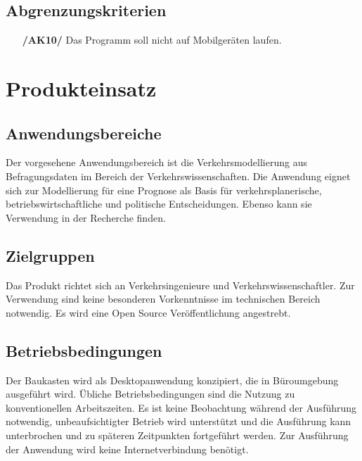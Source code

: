 \documentclass{article}
\begin{document}
\subsection{Abgrenzungskriterien}
\begin{itemize}
    \item[\textbf{/AK10/}] Das Programm soll nicht auf Mobilgeräten laufen.
\end{itemize}


\clearpage
\section{Produkteinsatz}
\subsection{Anwendungsbereiche}
Der vorgesehene Anwendungsbereich ist die Verkehrsmodellierung aus Befragungsdaten im Bereich der Verkehrswissenschaften. Die Anwendung eignet sich zur Modellierung für eine Prognose als Basis für verkehrsplanerische, betriebswirtschaftliche und politische Entscheidungen. Ebenso kann sie Verwendung in der Recherche finden.

\subsection{Zielgruppen}
Das Produkt richtet sich an Verkehrsingenieure und Verkehrswissenschaftler. Zur Verwendung sind keine besonderen Vorkenntnisse im technischen Bereich notwendig.\newline 
Es wird eine Open Source Veröffentlichung angestrebt.
  
\subsection{Betriebsbedingungen}
Der Baukasten wird als Desktopanwendung konzipiert, die in Büroumgebung ausgeführt wird. Übliche Betriebsbedingungen sind die Nutzung zu konventionellen Arbeitszeiten. Es ist keine Beobachtung während der Ausführung notwendig, unbeaufsichtigter Betrieb wird unterstützt und die Ausführung kann unterbrochen und zu späteren Zeitpunkten fortgeführt werden. Zur Ausführung der Anwendung wird keine Internetverbindung benötigt.\\
\end{document}
